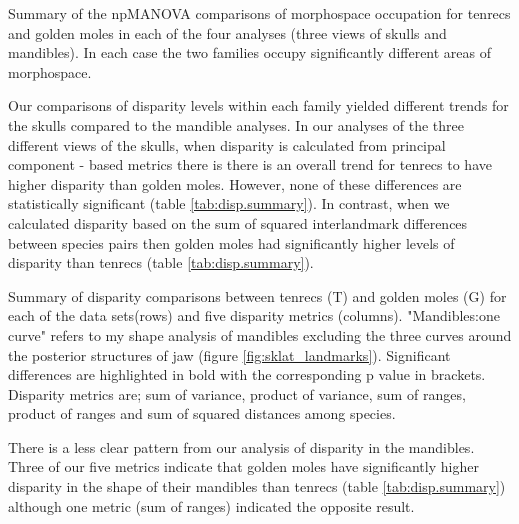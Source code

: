 	\begin{table}[!htb]	%

	\caption[Comparisons of morphospace occupation by tenrecs and golden moles (npMANOVA)]
		{Summary of the npMANOVA comparisons of morphospace occupation for tenrecs and golden moles in each of the four analyses (three views of skulls and mandibles). In each case the two families occupy significantly different areas of morphospace.}
	\centering
	 
	\label{tab:npmanova.summary}  
	\end{table}
	Our comparisons of disparity levels within each family yielded different trends for the skulls compared to the mandible analyses.	
	In our analyses of the three different views of the skulls, when disparity is calculated from principal component - based metrics there is there is an overall trend for tenrecs to have higher disparity than golden moles. However, none of these differences are statistically significant (table \ref{tab:disp.summary}). In contrast, when we calculated disparity based on the sum of squared interlandmark differences between species pairs \citep{Zelditch2012} then golden moles had significantly higher levels of disparity than tenrecs (table \ref{tab:disp.summary}).

\bigskip
	\begin{table}[!htb]			
	\caption[Comparisons of disparity metrics for tenrecs and golden moles]
		{Summary of disparity comparisons between tenrecs (T) and golden moles (G) for each of the data sets(rows) and five disparity metrics (columns). "Mandibles:one curve" refers to my shape analysis of mandibles excluding the three curves around the posterior structures of jaw (figure \ref{fig:sklat_landmarks}). Significant differences are highlighted in bold with the corresponding p value in brackets. Disparity metrics are; sum of variance, product of variance, sum of ranges, product of ranges and sum of squared distances among species. }
	\centering
	 
	\label{tab:disp.summary}  
	\end{table}
\bigskip
	There is a less clear pattern from our analysis of disparity in the mandibles. Three of our five metrics indicate that golden moles have significantly higher disparity in the shape of their mandibles than tenrecs (table \ref{tab:disp.summary}) although one metric (sum of ranges) indicated the opposite result. 
	
